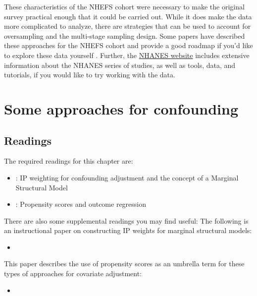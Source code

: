 \documentclass[
]{book}
\providecommand{\tightlist}{%
  \setlength{\itemsep}{0pt}\setlength{\parskip}{0pt}}
\begin{document}
These characteristics of the NHEFS cohort were necessary to make the original survey practical enough that it could be carried out. While it does make the data more complicated to analyze, there are strategies that can be used to account for oversampling and the multi-stage sampling design. Some papers have described these approaches for the NHEFS cohort and provide a good roadmap if you'd like to explore these data yourself \citep{korn1991epidemiologic, ingram1994statistical}. Further, the \href{https://www.cdc.gov/nchs/nhanes/index.htm}{NHANES website} includes extensive information about the NHANES series of studies, as well as tools, data, and tutorials, if you would like to try working with the data.

\hypertarget{some-approaches-for-confounding}{%
\chapter{Some approaches for confounding}\label{some-approaches-for-confounding}}

\hypertarget{readings-5}{%
\section{Readings}\label{readings-5}}

The required readings for this chapter are:

\begin{itemize}
\item
  \citet{hernanch12}: IP weighting for confounding adjustment and the concept of a Marginal Structural Model
\item
  \citet{hernanch15}: Propensity scores and outcome regression
\end{itemize}

There are also some supplemental readings you may find useful:
The following is an instructional paper on constructing IP weights for marginal structural models:

\begin{itemize}
\tightlist
\item
  \citet{cole2008constructing}
\end{itemize}

This paper describes the use of propensity scores as an umbrella term for these types of approaches for covariate adjustment:

\begin{itemize}
\tightlist
\item
  \citet{brookhart2013propensity}
\end{itemize}
\end{document}

